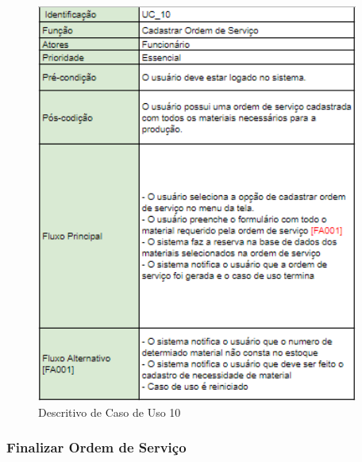 \documentclass[rascunho,xindy,acronym,symbols]{fei}
\begin{document}
\begin{figure}[H]
    \centering
    \includegraphics[scale=0.6, width=300pt]{./Images/Descritivos/UC10.png}
    \caption{Descritivo de Caso de Uso 10}
     \label{fig:desc_uc10}
\end{figure}

\subsubsection{Finalizar Ordem de Serviço}
\end{document}
